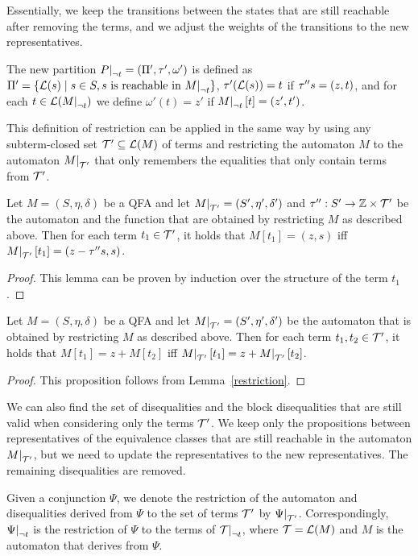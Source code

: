 Essentially, we keep the transitions between the states that are still reachable after removing the terms, and we adjust the weights of the transitions to the new representatives.

The new partition $\restr{P}{\neg t} = (\Pi', \tau', \omega')$ is defined as $\Pi' = \{\L(s) \mid s \in S, s \text{ is reachable in $\restr{M}{\neg t}$}\}$,
$\tau' (\mathcal{L}(s)) = t$ if $\tau'' s = (z, t)$, and
for each $t \in \L(\restr{M}{\neg t})$ we define $\omega'(t) = z'$ if $\restr{M}{\neg t}[t] = (z', t')$.

This definition of restriction can be applied in the same way by using any subterm-closed set $\mathcal{T}' \subseteq \mathcal{L}(M)$ of terms and restricting the automaton $M$ to the automaton $\restr{M}{\T'}$ that only remembers the equalities that only contain terms from $\mathcal{T}'$.

\begin{lemma}\label{restriction}
    Let $M = (S, \eta, \delta)$ be a QFA and let $\restr{M}{\T'} = (S', \eta', \delta')$ and $\tau'' : S' \rightarrow \mathbb{Z} \times \mathcal{T}'$ be the automaton and the function that are obtained by restricting $M$ as described above.
    Then for each term $t_1 \in \mathcal{T}'$, it holds that $M[t_1] = (z, s)$ iff $\restr{M}{\T'}[t_1] = (z - \repr s, s)$.
\end{lemma}
\begin{proof}
    This lemma can be proven by induction over the structure of the term $t_1$.
\end{proof}

\begin{proposition}
    Let $M = (S, \eta, \delta)$ be a QFA and let $\restr{M}{\T'} = (S', \eta', \delta')$ be the automaton that is obtained by restricting $M$ as described above.
    Then for each term $t_1, t_2 \in \mathcal{T}'$, it holds that $M[t_1] = z + M[t_2]$ iff $\restr{M}{\T'}[t_1] = z + \restr{M}{\T'}[t_2]$.
\end{proposition}
\begin{proof}
    This proposition follows from Lemma~\ref{restriction}.
\end{proof}

We can also find the set of disequalities and the block disequalities that are still valid when considering only the terms $\mathcal{T}'$.
We keep only the propositions between representatives of the equivalence classes that are still reachable in the automaton $\restr{M}{\T'}$, but we need to update the representatives to the new representatives.
The remaining disequalities are removed.

Given a conjunction $\Psi$, we denote the restriction of the automaton and disequalities derived from $\Psi$ to the set of terms $\mathcal{T}'$ by $\restr{\Psi}{\T'}$.
Correspondingly, $\restr{\Psi}{\neg t}$ is the restriction of $\Psi$ to the terms of $\restr{\T}{\neg t}$, where $\mathcal{T} = \mathcal{L}(M)$ and $M$ is the automaton that derives from $\Psi$.
